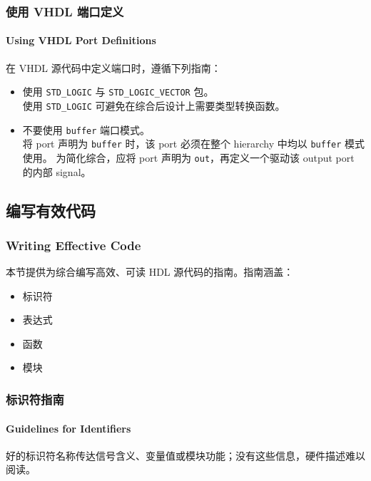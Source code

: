 \subsubsection{使用 VHDL 端口定义}
\paragraph*{Using VHDL Port Definitions}

在 VHDL 源代码中定义端口时，遵循下列指南：
\begin{itemize}
  \item 使用 \texttt{STD\_LOGIC} 与 \texttt{STD\_LOGIC\_VECTOR} 包。\\
        使用 \texttt{STD\_LOGIC} 可避免在综合后设计上需要类型转换函数。
  \item 不要使用 \texttt{buffer} 端口模式。\\
        将 port 声明为 \texttt{buffer} 时，该 port 必须在整个 hierarchy 中均以 \texttt{buffer} 模式使用。
        为简化综合，应将 port 声明为 \texttt{out}，再定义一个驱动该 output port 的内部 signal。
\end{itemize}

\subsection{编写有效代码}
\subsubsection*{Writing Effective Code}

本节提供为综合编写高效、可读 HDL 源代码的指南。指南涵盖：
\begin{itemize}
  \item 标识符
  \item 表达式
  \item 函数
  \item 模块
\end{itemize}

\subsubsection{标识符指南}
\paragraph*{Guidelines for Identifiers}

好的标识符名称传达信号含义、变量值或模块功能；没有这些信息，硬件描述难以阅读。

